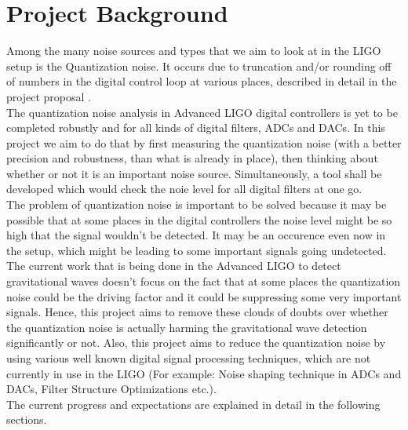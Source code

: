 \documentclass[colorlinks=true,pdfstartview=FitV,linkcolor=blue,
            citecolor=red,urlcolor=magenta]{ligodoc}
\begin{document}
\section{Project Background}
Among the many noise sources and types that we aim to look at in the LIGO setup is the Quantization noise. It occurs due to truncation and/or rounding off of numbers in the digital control loop at various places, described in detail in the project proposal \cite{ProjectProposal}. \\
The quantization noise analysis in Advanced LIGO digital controllers is yet to be completed robustly and for all kinds of digital filters, ADCs and DACs. In this project we aim to do that by first measuring the quantization noise (with a better precision and robustness, than what is already in place), then thinking about whether or not it is an important noise  source. Simultaneously, a tool shall be developed which would check the noie level for all digital filters at one go. \\ 
The problem of quantization noise is important to be solved because it may be possible that at some places in the digital controllers the noise level might be so high that the signal wouldn't be detected. It may be an occurence even now in the setup, which might be leading to some important signals going undetected. The current work that is being done in the Advanced LIGO to detect gravitational waves doesn't focus on the fact that at some places the quantization noise could be the driving factor and it could be suppressing some very important signals. Hence, this project aims to remove these clouds of doubts over whether the quantization noise is actually harming the gravitational wave detection significantly or not. Also, this project aims to reduce the quantization noise by using various well known digital signal processing techniques, which are not currently in use in the LIGO (For example: Noise shaping technique in ADCs and DACs, Filter Structure Optimizations etc.).   
\\
The current progress and expectations are explained in detail in the following sections.
\end{document}
